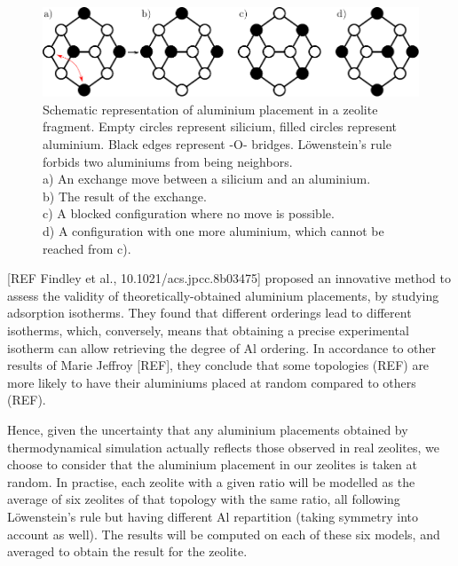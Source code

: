 \documentclass[main.tex]{subfiles}
\begin{document}
\begin{figure}
	\centering
	\includegraphics[width=\columnwidth]{figures/cations/blocked_situation.pdf}
	\caption{Schematic representation of aluminium placement in a zeolite fragment. Empty circles represent silicium, filled circles represent aluminium. Black edges represent -O- bridges. L\"owenstein's rule forbids two aluminiums from being neighbors.\\a) An exchange move between a silicium and an aluminium.\\b) The result of the exchange.\\c) A blocked configuration where no move is possible.\\d) A configuration with one more aluminium, which cannot be reached from c).}\label{fig:blocked_situation}
\end{figure}

[REF Findley et al., 10.1021/acs.jpcc.8b03475] proposed an innovative method to assess the validity of theoretically-obtained aluminium placements, by studying  adsorption isotherms. They found that different \SiAl orderings lead to different isotherms, which, conversely, means that obtaining a precise experimental isotherm can allow retrieving the degree of Al ordering. In accordance to other results of Marie Jeffroy [REF], they conclude that some topologies (REF) are more likely to have their aluminiums placed at random compared to others (REF).

Hence, given the uncertainty that any aluminium placements obtained by thermodynamical simulation actually reflects those observed in real zeolites, we choose to consider that the aluminium placement in our zeolites is taken at random. In practise, each zeolite with a given \SiAl ratio will be modelled as the average of six zeolites of that topology with the same \SiAl ratio, all following L\"owenstein's rule but having different Al repartition (taking symmetry into account as well). The results will be computed on each of these six models, and averaged to obtain the result for the zeolite.
\end{document}
